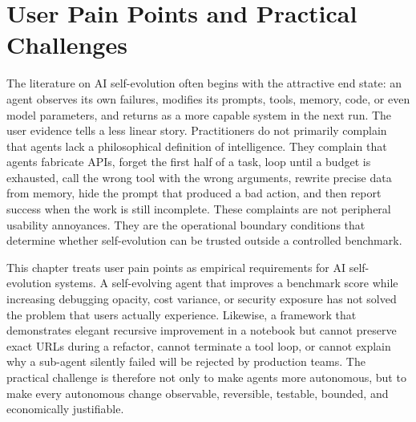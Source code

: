 
\providecommand{\sevcritical}{\textsc{Critical}}
\providecommand{\sevhigh}{\textsc{High}}
\providecommand{\sevmedium}{\textsc{Medium}}
\providecommand{\sevlow}{\textsc{Low}}
\providecommand{\pain}[1]{\textit{#1}}

\section{User Pain Points and Practical Challenges}
\label{sec:user-pain-points}

The literature on AI self-evolution often begins with the attractive end state: an agent observes its own failures, modifies its prompts, tools, memory, code, or even model parameters, and returns as a more capable system in the next run. The user evidence tells a less linear story. Practitioners do not primarily complain that agents lack a philosophical definition of intelligence. They complain that agents fabricate APIs, forget the first half of a task, loop until a budget is exhausted, call the wrong tool with the wrong arguments, rewrite precise data from memory, hide the prompt that produced a bad action, and then report success when the work is still incomplete. These complaints are not peripheral usability annoyances. They are the operational boundary conditions that determine whether self-evolution can be trusted outside a controlled benchmark.

This chapter treats user pain points as empirical requirements for AI self-evolution systems. A self-evolving agent that improves a benchmark score while increasing debugging opacity, cost variance, or security exposure has not solved the problem that users actually experience. Likewise, a framework that demonstrates elegant recursive improvement in a notebook but cannot preserve exact URLs during a refactor, cannot terminate a tool loop, or cannot explain why a sub-agent silently failed will be rejected by production teams. The practical challenge is therefore not only to make agents more autonomous, but to make every autonomous change observable, reversible, testable, bounded, and economically justifiable.

